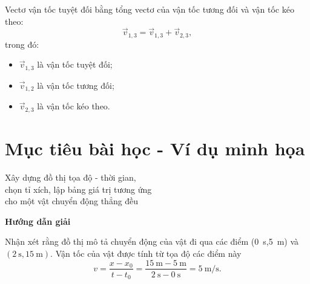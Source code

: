 Vectơ vận tốc tuyệt đối bằng tổng vectơ của vận tốc tương đối và vận tốc kéo theo:
$$\vec{v}_{1,3}=\vec{v}_{1,3}+\vec{v}_{2,3},$$
trong đó:
\begin{itemize}
	\item $\vec{v}_{1,3}$ là vận tốc tuyệt đối;
	\item $\vec{v}_{1,2}$  là vận tốc tương đối;
	\item $\vec{v}_{2,3}$  là vận tốc kéo theo.
\end{itemize}
\section{Mục tiêu bài học - Ví dụ minh họa}
\begin{dang}{Xây dựng đồ thị tọa độ - thời gian,\\ chọn tỉ xích, lập bảng giá trị tương ứng \\cho một vật chuyển động thẳng đều}
	{	\begin{center}
			\textbf{Hướng dẫn giải}
		\end{center}
		Nhận xét rằng đồ thị mô tả chuyển động của vật đi qua các điểm (\SI{0}{\second},\SI{5}{\meter}) và $(\SI{2}{\second},\SI{15}{\meter})$. Vận tốc của vật được tính từ tọa độ các điểm này 
		\begin{equation*}
			v=\dfrac{x-x_0}{t-t_0}=\dfrac{\SI{15}{\meter}-\SI{5}{\meter}}{\SI{2}{\second}-\SI{0}{\second}}=\SI{5}{\meter/\second}.
		\end{equation*}
		
}
\end{dang}
